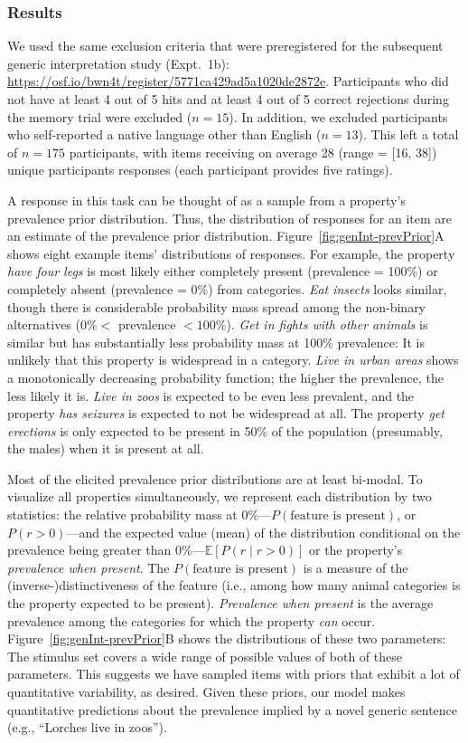 \documentclass[floatsintext,doc]{apa6}
\begin{document}
\hypertarget{results}{%
\subsubsection{Results}\label{results}}

We used the same exclusion criteria that were preregistered for the subsequent generic interpretation study (Expt.~1b): \url{https://osf.io/bwn4t/register/5771ca429ad5a1020de2872e}.
Participants who did not have at least 4 out of 5 hits and at least 4 out of 5 correct rejections during the memory trial were excluded (\(n = 15\)).
In addition, we excluded participants who self-reported a native language other than English (\(n = 13\)).
This left a total of \(n = 175\) participants, with items receiving on average 28 (range = {[}16, 38{]}) unique participants responses (each participant provides five ratings).

A response in this task can be thought of as a sample from a property's prevalence prior distribution.
Thus, the distribution of responses for an item are an estimate of the prevalence prior distribution.
Figure~\ref{fig:genInt-prevPrior}A shows eight example items' distributions of responses.
For example, the property \emph{have four legs} is most likely either completely present (prevalence = 100\%) or completely absent (prevalence = 0\%) from categories.
\emph{Eat insects} looks similar, though there is considerable probability mass spread among the non-binary alternatives (\(0\% <\) prevalence \(< 100\%\)).
\emph{Get in fights with other animals} is similar but has substantially less probability mass at 100\% prevalence: It is unlikely that this property is widespread in a category.
\emph{Live in urban areas} shows a monotonically decreasing probability function; the higher the prevalence, the less likely it is.
\emph{Live in zoos} is expected to be even less prevalent, and the property \emph{has seizures} is expected to not be widespread at all.
The property \emph{get erections} is only expected to be present in 50\% of the population (presumably, the males) when it is present at all.

Most of the elicited prevalence prior distributions are at least bi-modal.
To visualize all properties simultaneously, we represent each distribution by two statistics: the relative probability mass at 0\%---\(P(\text{feature is present})\), or \(P(r > 0)\)---and the expected value (mean) of the distribution conditional on the prevalence being greater than 0\%---\(\mathbb{E}[P(r \mid r>0)]\) or the property's \emph{prevalence when present}.
The $P(\text{feature is present})$ is a measure of the (inverse-)distinctiveness of the feature (i.e., among how many animal categories is the property expected to be present). 
\emph{Prevalence when present} is the average prevalence among the categories for which the property \emph{can} occur. 
Figure~\ref{fig:genInt-prevPrior}B shows the distributions of these two parameters: The stimulus set covers a wide range of possible values of both of these parameters.
This suggests we have sampled items with priors that exhibit a lot of quantitative variability, as desired.
Given these priors, our model makes quantitative predictions about the prevalence implied by a novel generic sentence (e.g., \enquote{Lorches live in zoos}).
\end{document}
